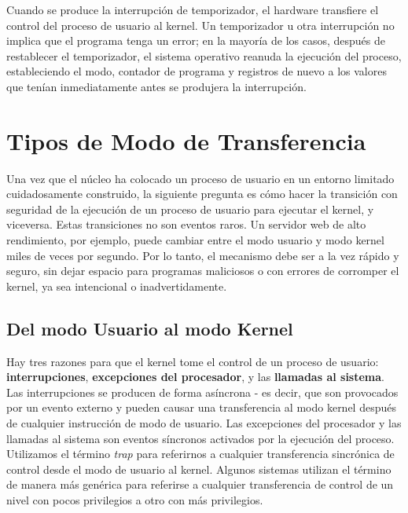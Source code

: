 \documentclass[10pt]{book}
\begin{document}
Cuando se produce la interrupción de temporizador, el hardware transfiere el control del proceso de usuario al kernel. Un temporizador u otra interrupción no implica que el programa tenga un error; en la mayoría de los casos, después de restablecer el temporizador, el sistema operativo reanuda la ejecución del proceso, estableciendo el modo, contador de programa y registros de nuevo a los valores que tenían inmediatamente antes se produjera la interrupción.

\section{Tipos de Modo de Transferencia}

Una vez que el núcleo ha colocado un proceso de usuario en un entorno limitado cuidadosamente construido, la siguiente pregunta es cómo hacer la transición con seguridad de la ejecución de un proceso de usuario para ejecutar el kernel, y viceversa. Estas transiciones no son eventos raros. Un servidor web de alto rendimiento, por ejemplo, puede cambiar entre el modo usuario y modo kernel miles de veces por segundo. Por lo tanto, el mecanismo debe ser a la vez rápido y seguro, sin dejar espacio para programas maliciosos o con errores de corromper el kernel, ya sea intencional o inadvertidamente.

\subsection{Del modo Usuario al modo Kernel}

Hay tres razones para que el kernel tome el control de un proceso de usuario: \textbf{interrupciones}, \textbf{excepciones del procesador}, y las \textbf{llamadas al sistema}. Las interrupciones se producen de forma asíncrona - es decir, que son provocados por un evento externo y pueden causar una transferencia al modo kernel después de cualquier instrucción de modo de usuario. Las excepciones del procesador y las llamadas al sistema son eventos síncronos activados por la ejecución del proceso. Utilizamos el término \textit{trap} para referirnos a cualquier transferencia sincrónica de control desde el modo de usuario al kernel. Algunos sistemas utilizan el término de manera más genérica para referirse a cualquier transferencia de control de un nivel con pocos privilegios a otro con más privilegios.
\end{document}
